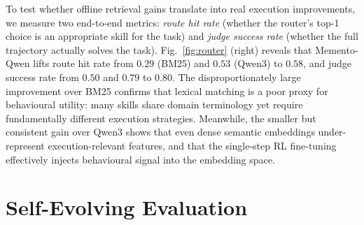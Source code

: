 \documentclass[11pt,a4paper]{article}
\begin{document}
\begin{sharedtrack}
To test whether offline retrieval gains translate into real execution improvements, we measure two end-to-end metrics: \emph{route hit rate} (whether the router’s top-1 choice is an appropriate skill for the task) and \emph{judge success rate} (whether the full trajectory actually solves the task). Fig.~\ref{fig:router} (right) reveals that Memento-Qwen lifts route hit rate from $0.29$ (BM25) and $0.53$ (Qwen3) to $0.58$, and judge success rate from $0.50$ and $0.79$ to $0.80$. The disproportionately large improvement over BM25 confirms that lexical matching is a poor proxy for behavioural utility: many skills share domain terminology yet require fundamentally different execution strategies. Meanwhile, the smaller but consistent gain over Qwen3 shows that even dense semantic embeddings under-represent execution-relevant features, and that the single-step RL fine-tuning effectively injects behavioural signal into the embedding space.
\end{sharedtrack}


\newpage
\section{Self-Evolving Evaluation}
\end{document}
